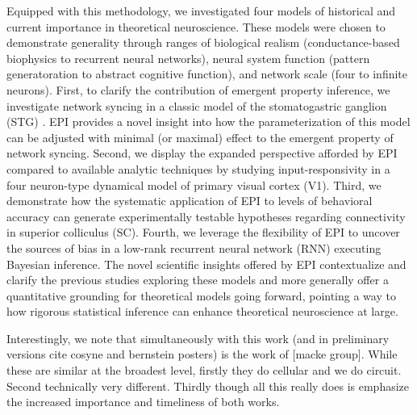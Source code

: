 \documentclass[11pt]{article}
\begin{document}
Equipped with this methodology, we investigated four models of historical and current importance in theoretical neuroscience.
These models were chosen to demonstrate generality through ranges of biological realism (conductance-based biophysics to recurrent neural networks), neural system function (pattern generatoration to abstract cognitive function), and network scale (four to infinite neurons).
First, to clarify the contribution of emergent property inference, we investigate network syncing in a classic model of the stomatogastric ganglion (STG) \cite{gutierrez2013multiple}.  
EPI provides a novel insight into how the parameterization of this model can be adjusted with minimal (or maximal) effect to the emergent property of network syncing.   
Second, we display the expanded perspective afforded by EPI compared to available analytic techniques by studying input-responsivity in a four neuron-type dynamical model of primary visual cortex (V1).  
Third, we demonstrate how the systematic application of EPI to levels of behavioral accuracy can generate experimentally testable hypotheses regarding connectivity in superior colliculus (SC).  
Fourth, we leverage the flexibility of EPI to uncover the sources of bias in a low-rank recurrent neural network (RNN) executing Bayesian inference.  
The novel scientific insights offered by EPI contextualize and clarify the previous studies exploring these models and more generally offer a quantitative grounding for theoretical models  going forward, pointing a way to how rigorous statistical inference can enhance theoretical neuroscience at large.

Interestingly, we note that simultaneously with this work (and in preliminary versions cite cosyne and bernstein posters) is the work of [macke group].  
While these are similar at the broadest level, firstly they do cellular and we do circuit.  
Second technically very different.  
Thirdly though all this really does is emphasize the increased importance and timeliness of both works.  




\end{document}

